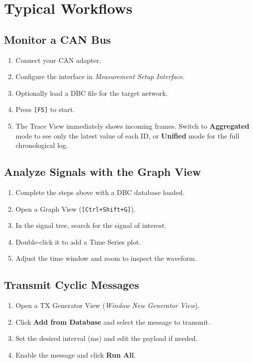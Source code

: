 \documentclass[a4paper,11pt]{article}
\newcommand{\key}[1]{\texttt{\small[#1]}}
\newcommand{\menu}[1]{\textit{#1}}
\newcommand{\ui}[1]{\textbf{#1}}
\begin{document}
\section{Typical Workflows}

\subsection{Monitor a CAN Bus}

\begin{enumerate}
  \item Connect your CAN adapter.
  \item Configure the interface in \menu{Measurement \textrightarrow{} Setup Interface}.
  \item Optionally load a DBC file for the target network.
  \item Press \key{F5} to start.
  \item The Trace View immediately shows incoming frames. Switch to
        \ui{Aggregated} mode to see only the latest value of each ID,
        or \ui{Unified} mode for the full chronological log.
\end{enumerate}

\subsection{Analyze Signals with the Graph View}

\begin{enumerate}
  \item Complete the steps above with a DBC database loaded.
  \item Open a Graph View (\key{Ctrl+Shift+G}).
  \item In the signal tree, search for the signal of interest.
  \item Double-click it to add a Time Series plot.
  \item Adjust the time window and zoom to inspect the waveform.
\end{enumerate}

\subsection{Transmit Cyclic Messages}

\begin{enumerate}
  \item Open a TX Generator View (\menu{Window \textrightarrow{} New \textrightarrow{} Generator View}).
  \item Click \ui{Add from Database} and select the message to transmit.
  \item Set the desired interval (ms) and edit the payload if needed.
  \item Enable the message and click \ui{Run All}.
\end{enumerate}
\end{document}
